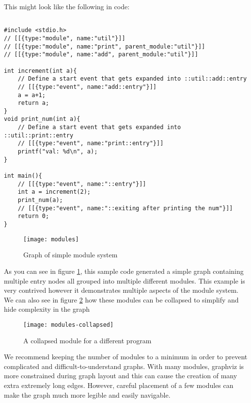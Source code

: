 This might look like the following in code:

\begin{verbatim}

#include <stdio.h>
// [[{type:"module", name:"util"}]]
// [[{type:"module", name:"print", parent_module:"util"}]]
// [[{type:"module", name:"add", parent_module:"util"}]]

int increment(int a){
    // Define a start event that gets expanded into ::util::add::entry
    // [[{type:"event", name:"add::entry"}]]
    a = a+1;
    return a;
}
void print_num(int a){
    // Define a start event that gets expanded into ::util::print::entry
    // [[{type:"event", name:"print::entry"}]]
    printf("val: %d\n", a);
}

int main(){
    // [[{type:"event", name:"::entry"}]]
    int a = increment(2);
    print_num(a);
    // [[{type:"event", name:"::exiting after printing the num"}]]
    return 0;
}
\end{verbatim}
\begin{figure}[!ht]
    \centering
\texttt{[image: modules]}
    \caption{Graph of simple module system}
    \label{fig:modules}
\end{figure}

As you can see in figure \ref{fig:modules}, this sample code generated a simple graph containing multiple entry nodes all grouped into multiple different modules. This example is very contrived however it demonstrates multiple aspects of the module system. We can also see in figure \ref{fig:modules-collapsed} how these modules can be collapsed to simplify and hide complexity in the graph


\begin{figure}[!ht]
\centering
\texttt{[image: modules-collapsed]}
\caption{A collapsed module for a different program}
    \label{fig:modules-collapsed}
\end{figure}

We recommend keeping the number of modules to a minimum in order to prevent complicated and difficult-to-understand graphs. With many modules, graphviz is more constrained during graph layout and this can cause the creation of many extra extremely long edges. However, careful placement of a few modules can make the graph much more legible and easily navigable. 



